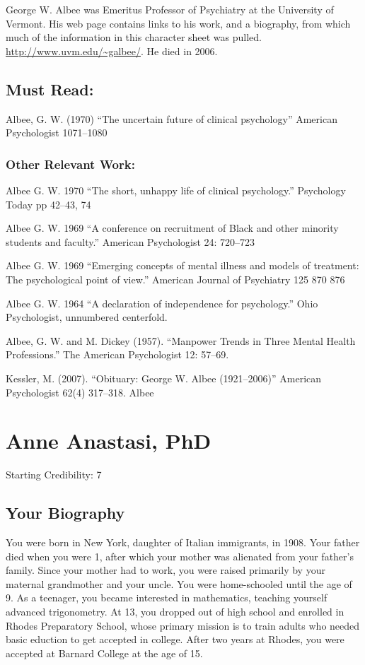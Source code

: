 \begin{refsection}
George W. Albee was Emeritus Professor of Psychiatry at the University of Vermont. His web page contains links to his work, and a biography, from which much of the information in this character sheet was pulled. \url{http://www.uvm.edu/~galbee/}. He died in 2006.

\section{Must Read:}
\label{mustread:}

Albee, G. W. (1970) “The uncertain future of clinical psychology” American Psychologist 1071--1080

\subsection{Other Relevant Work:}
\label{otherrelevantwork:}

Albee G. W. 1970 “The short, unhappy life of clinical psychology.” Psychology Today pp 42--43, 74

Albee G. W. 1969 “A conference on recruitment of Black and other minority students and faculty.” American Psychologist 24: 720--723

Albee G. W. 1969 “Emerging concepts of mental illness and models of treatment: The psychological point of view.” American Journal of Psychiatry 125 870 876

Albee G. W. 1964 “A declaration of independence for psychology.” Ohio Psychologist, unnumbered centerfold.

Albee, G. W. and M. Dickey (1957). ``Manpower Trends in Three Mental Health Professions.'' The American Psychologist 12: 57--69.

Kessler, M. (2007). “Obituary: George W. Albee (1921--2006)” American Psychologist 62(4) 317--318.
Albee

\chapter{Anne Anastasi, PhD}
\label{anneanastasiphd}

Starting Credibility: 7

\section{Your Biography}
\label{yourbiography}

You were born in New York, daughter of Italian immigrants, in 1908. Your father died when you were 1, after which your mother was alienated from your father's family. Since your mother had to work, you were raised primarily by your maternal grandmother and your uncle. You were home-schooled until the age of 9. As a teenager, you became interested in mathematics, teaching yourself advanced trigonometry. At 13, you dropped out of high school and enrolled in Rhodes Preparatory School, whose primary mission is to train adults who needed basic eduction to get accepted in college. After two years at Rhodes, you were accepted at Barnard College at the age of 15.


\end{refsection}
